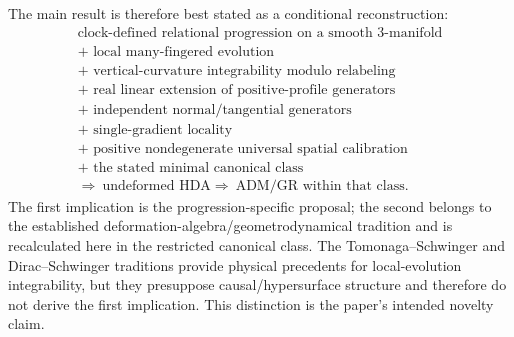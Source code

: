 \documentclass[11pt]{article}
\begin{document}
The main result is therefore best stated as a conditional reconstruction:
\begin{equation}
\boxed{
\begin{gathered}
\text{clock-defined relational progression on a smooth 3-manifold}\\
+\text{ local many-fingered evolution}\\
+\text{ vertical-curvature integrability modulo relabeling}\\
+\text{ real linear extension of positive-profile generators}\\
+\text{ independent normal/tangential generators}\\
+\text{ single-gradient locality}\\
+\text{ positive nondegenerate universal spatial calibration}\\
+\text{ the stated minimal canonical class}
\\[2pt]
\Longrightarrow\ \text{undeformed HDA}
\Longrightarrow\ \text{ADM/GR within that class}.
\end{gathered}}
\label{eq:conditional_reconstruction}
\end{equation}
The first implication is the progression-specific proposal; the second belongs to the established deformation-algebra/geometrodynamical tradition and is recalculated here in the restricted canonical class. The Tomonaga--Schwinger and Dirac--Schwinger traditions provide physical precedents for local-evolution integrability, but they presuppose causal/hypersurface structure and therefore do not derive the first implication. This distinction is the paper's intended novelty claim.
\end{document}
